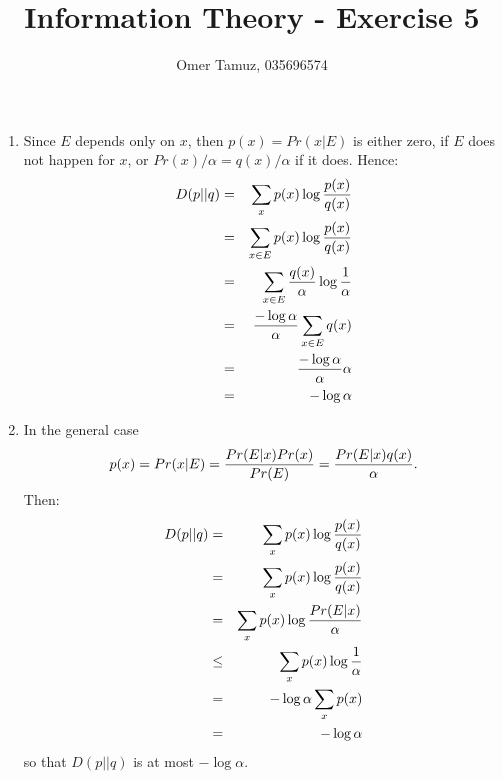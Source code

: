 \documentclass[11pt]{article} \usepackage{amssymb}
\begin{document}
\title{Information Theory - Exercise 5}

 \author{Omer Tamuz, 035696574}
\maketitle


\begin{enumerate}
\item
Since $E$ depends only on $x$, then $p(x)=Pr(x|E)$ is either zero, if $E$
does not happen for $x$, or $Pr(x)/\alpha=q(x)/\alpha$ if it does. Hence:
  \begin{eqnarray*}
    D(p||q) &=& \sum_xp(x)\log{p(x)\over q(x)}
    \\ &=& \sum_{x\in E}p(x)\log{p(x)\over q(x)}
    \\ &=& \sum_{x\in E}{q(x)\over \alpha}\log{1\over \alpha}
    \\ &=& {-\log \alpha \over \alpha}\sum_{x\in E}q(x)
    \\ &=& {-\log \alpha \over \alpha}\alpha
    \\ &=& -\log \alpha
  \end{eqnarray*}

\item
In the general case
\begin{equation*}
 p(x)=Pr(x|E)={Pr(E|x)Pr(x)\over Pr(E)}={Pr(E|x)q(x)\over \alpha}. 
\end{equation*}
Then:
  \begin{eqnarray*}
    D(p||q) &=& \sum_xp(x)\log{p(x)\over q(x)}
    \\ &=& \sum_xp(x)\log{p(x)\over q(x)}
    \\ &=& \sum_xp(x)\log{Pr(E|x)\over \alpha}
    \\ &\leq& \sum_xp(x)\log{1\over \alpha}
    \\ &=& -\log\alpha\sum_xp(x)
    \\ &=& -\log\alpha
  \end{eqnarray*}
so that $D(p||q)$ is at most $-\log \alpha$.


\end{enumerate}
\end{document}
